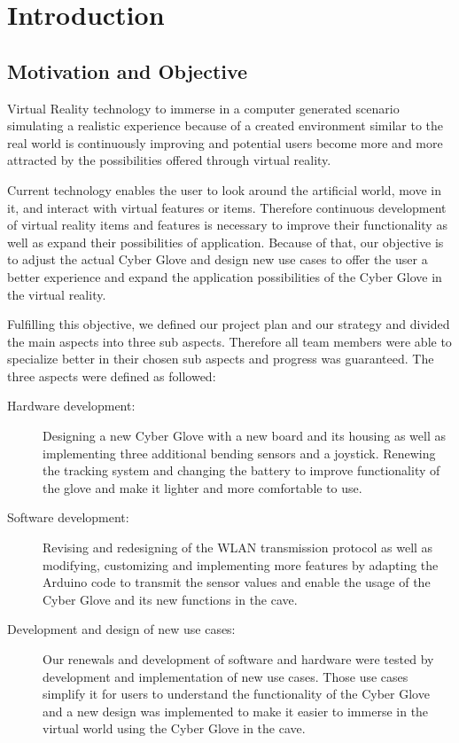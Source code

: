 \section{Introduction}

\subsection{Motivation and Objective}

Virtual Reality technology to immerse in a computer generated scenario simulating a realistic experience because of a created environment similar to the real world is continuously improving and potential users become more and more attracted by the possibilities offered through virtual reality.

Current technology enables the user to look around the artificial world, move in it, and interact with virtual features or items. Therefore continuous development of virtual reality items and features is necessary to improve their functionality as well as expand their possibilities of application. Because of that, our objective is to adjust the actual Cyber Glove and design new use cases to offer the user a better experience and expand the application possibilities of the Cyber Glove in the virtual reality.

Fulfilling this objective, we defined our project plan and our strategy and divided the main aspects into three sub aspects. Therefore all team members were able to specialize better in their chosen sub aspects and progress was guaranteed. The three aspects were defined as followed:


\begin{description}
	\item[Hardware development:] Designing a new Cyber Glove with a new board and its housing as well as implementing three additional bending sensors and a joystick. Renewing the tracking system and changing the battery to improve functionality of the glove and make it lighter and more comfortable to use.
	
	\item[Software development:] Revising and redesigning of the WLAN transmission protocol as well as modifying, customizing and implementing more features by adapting the Arduino code to transmit the sensor values and enable the usage of the Cyber Glove and its new functions in the cave. 
	
	\item[Development and design of new use cases:] Our renewals and development of software and hardware were tested by development and implementation of new use cases. Those use cases simplify it for users to understand the functionality of the Cyber Glove and a new design was implemented to make it easier to immerse in the virtual world using the Cyber Glove in the cave.
\end{description}

